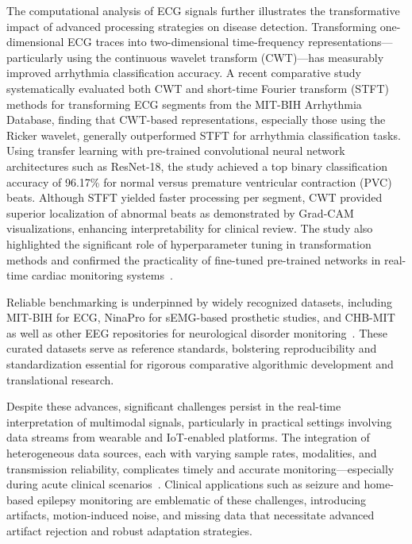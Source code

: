 \documentclass[sigconf]{acmart}
\begin{document}
The computational analysis of ECG signals further illustrates the transformative impact of advanced processing strategies on disease detection. Transforming one-dimensional ECG traces into two-dimensional time-frequency representations—particularly using the continuous wavelet transform (CWT)—has measurably improved arrhythmia classification accuracy. A recent comparative study systematically evaluated both CWT and short-time Fourier transform (STFT) methods for transforming ECG segments from the MIT-BIH Arrhythmia Database, finding that CWT-based representations, especially those using the Ricker wavelet, generally outperformed STFT for arrhythmia classification tasks. Using transfer learning with pre-trained convolutional neural network architectures such as ResNet-18, the study achieved a top binary classification accuracy of 96.17\% for normal versus premature ventricular contraction (PVC) beats. Although STFT yielded faster processing per segment, CWT provided superior localization of abnormal beats as demonstrated by Grad-CAM visualizations, enhancing interpretability for clinical review. The study also highlighted the significant role of hyperparameter tuning in transformation methods and confirmed the practicality of fine-tuned pre-trained networks in real-time cardiac monitoring systems~\cite{ref101}.

Reliable benchmarking is underpinned by widely recognized datasets, including MIT-BIH for ECG, NinaPro for sEMG-based prosthetic studies, and CHB-MIT as well as other EEG repositories for neurological disorder monitoring~\cite{ref96,ref97,ref101}. These curated datasets serve as reference standards, bolstering reproducibility and standardization essential for rigorous comparative algorithmic development and translational research.

Despite these advances, significant challenges persist in the real-time interpretation of multimodal signals, particularly in practical settings involving data streams from wearable and IoT-enabled platforms. The integration of heterogeneous data sources, each with varying sample rates, modalities, and transmission reliability, complicates timely and accurate monitoring—especially during acute clinical scenarios~\cite{ref98,ref102,ref106,ref107}. Clinical applications such as seizure and home-based epilepsy monitoring are emblematic of these challenges, introducing artifacts, motion-induced noise, and missing data that necessitate advanced artifact rejection and robust adaptation strategies.
\end{document}
